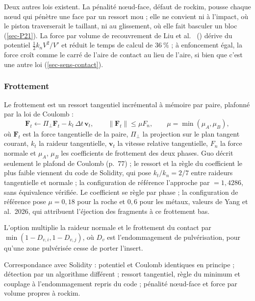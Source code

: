 Deux autres lois existent. La pénalité nœud-face, défaut de rockim, pousse chaque nœud qui pénètre une face par un ressort mou ; elle ne convient ni à l'impact, où le piston traverserait le taillant, ni au glissement, où elle fait basculer un bloc (\cref{sec-P21}). La force par volume de recouvrement de Liu et al.~\cite{liu2022overlap} () dérive du potentiel $\frac12 k_n V^2/V'$ et réduit le temps de calcul de $36~\%$ ; à enfoncement égal, la force croît comme le carré de l'aire de contact au lieu de l'aire, si bien que c'est une autre loi (\cref{sec-sens-contact}).

\subsubsection{Frottement}

Le frottement est un ressort tangentiel incrémental à mémoire par paire, plafonné par la loi de Coulomb :
\begin{equation}
\mathbf F_t \leftarrow \Pi_\perp \mathbf F_t - k_t\,\Delta t\,\mathbf v_t, \qquad \|\mathbf F_t\| \leq \mu F_n, \qquad \mu = \min(\mu_A, \mu_B) ,
\label{eq-frott}
\end{equation}
où $\mathbf F_t$ est la force tangentielle de la paire, $\Pi_\perp$ la projection sur le plan tangent courant, $k_t$ la raideur tangentielle, $\mathbf v_t$ la vitesse relative tangentielle, $F_n$ la force normale et $\mu_A$, $\mu_B$ les coefficients de frottement des deux phases. Guo décrit seulement le plafond de Coulomb (p.~77) ; le ressort et la règle du coefficient le plus faible viennent du code de Solidity, qui pose $k_t/k_n = 2/7$ entre raideurs tangentielle et normale ; la configuration de référence l'approche par  $= 1{,}4286$, sans équivalence vérifiée. Le coefficient se règle par phase ; la configuration de référence pose $\mu = 0{,}18$ pour la roche et $0{,}6$ pour les métaux, valeurs de Yang et al.~2026, qui attribuent l'éjection des fragments à ce frottement bas.

L'option  multiplie la raideur normale et le frottement du contact par $\min(1 - D_{v,i}, 1 - D_{v,j})$, où $D_v$ est l'endommagement de pulvérisation, pour qu'une zone pulvérisée cesse de porter l'insert.

Correspondance avec Solidity : potentiel et Coulomb identiques en principe ; détection par un algorithme différent ; ressort tangentiel, règle du minimum et couplage à l'endommagement repris du code ; pénalité nœud-face et force par volume propres à rockim.

